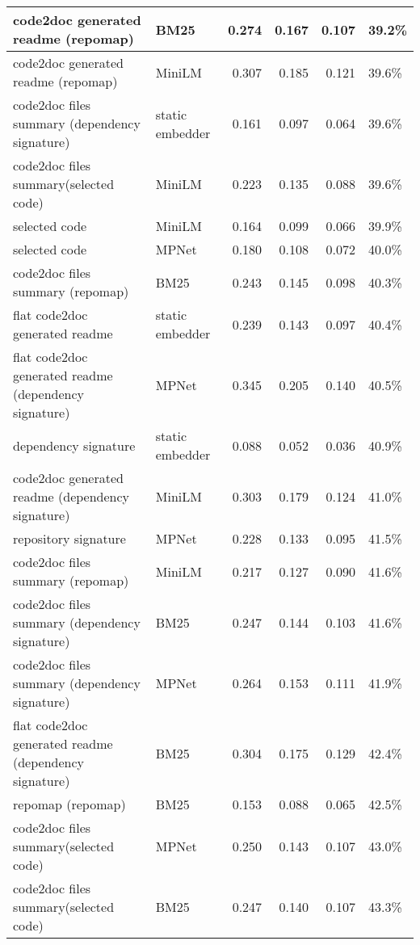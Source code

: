 \begin{tabular}{||l|l|r|r|r|l||}
\hline
{\color{cyan} code2doc generated readme (repomap)} & BM25 & 0.274 & 0.167 & 0.107 & 39.2\% \\
\hline
{\color{cyan} code2doc generated readme (repomap)} & MiniLM & 0.307 & 0.185 & 0.121 & 39.6\% \\
\hline
{\color{blue} code2doc files summary (dependency signature)} & static embedder & 0.161 & 0.097 & 0.064 & 39.6\% \\
\hline
{\color{green} code2doc files summary(selected code)} & MiniLM & 0.223 & 0.135 & 0.088 & 39.6\% \\
\hline
selected code & MiniLM & 0.164 & 0.099 & 0.066 & 39.9\% \\
\hline
selected code & MPNet & 0.180 & 0.108 & 0.072 & 40.0\% \\
\hline
{\color{cyan} code2doc files summary (repomap)} & BM25 & 0.243 & 0.145 & 0.098 & 40.3\% \\
\hline
{\color{green} flat code2doc generated readme} & static embedder & 0.239 & 0.143 & 0.097 & 40.4\% \\
\hline
{\color{blue} flat code2doc generated readme (dependency signature)} & MPNet & 0.345 & 0.205 & 0.140 & 40.5\% \\
\hline
{\color{red} dependency signature} & static embedder & 0.088 & 0.052 & 0.036 & 40.9\% \\
\hline
{\color{blue} code2doc generated readme (dependency signature)} & MiniLM & 0.303 & 0.179 & 0.124 & 41.0\% \\
\hline
{\color{red} repository signature} & MPNet & 0.228 & 0.133 & 0.095 & 41.5\% \\
\hline
{\color{cyan} code2doc files summary (repomap)} & MiniLM & 0.217 & 0.127 & 0.090 & 41.6\% \\
\hline
{\color{blue} code2doc files summary (dependency signature)} & BM25 & 0.247 & 0.144 & 0.103 & 41.6\% \\
\hline
{\color{blue} code2doc files summary (dependency signature)} & MPNet & 0.264 & 0.153 & 0.111 & 41.9\% \\
\hline
{\color{blue} flat code2doc generated readme (dependency signature)} & BM25 & 0.304 & 0.175 & 0.129 & 42.4\% \\
\hline
{\color{cyan} repomap (repomap)} & BM25 & 0.153 & 0.088 & 0.065 & 42.5\% \\
\hline
{\color{green} code2doc files summary(selected code)} & MPNet & 0.250 & 0.143 & 0.107 & 43.0\% \\
\hline
{\color{green} code2doc files summary(selected code)} & BM25 & 0.247 & 0.140 & 0.107 & 43.3\% \\

\end{tabular}
